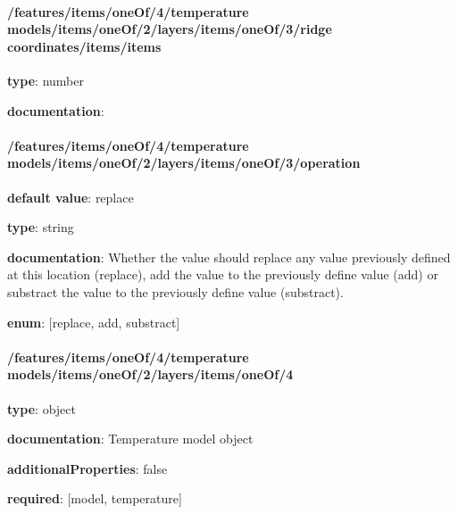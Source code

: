 \begin{itemized}
\begin{itemized}
\paragraph{/features/items/oneOf/4/temperature models/items/oneOf/2/layers/items/oneOf/3/ridge coordinates/items/items} \begin{itemized}
\item {\bf type}: number
\end{itemized}\item {\bf documentation}: 
\end{itemized}\end{itemized}\paragraph{/features/items/oneOf/4/temperature models/items/oneOf/2/layers/items/oneOf/3/operation} \begin{itemized}
\item {\bf default value}: replace
\item {\bf type}: string
\item {\bf documentation}: Whether the value should replace any value previously defined at this location (replace), add the value to the previously define value (add) or substract the value to the previously define value (substract).
\item {\bf enum}: [replace, add, substract]\end{itemized}\paragraph{/features/items/oneOf/4/temperature models/items/oneOf/2/layers/items/oneOf/4} \begin{itemized}
\item {\bf type}: object
\item {\bf documentation}: Temperature model object
\item {\bf additionalProperties}: false
\item {\bf required}: [model, temperature]\end{itemized}

